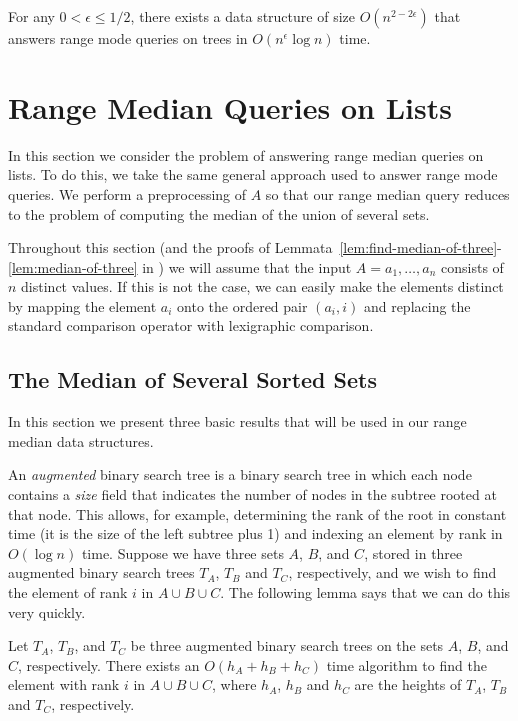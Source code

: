 \documentclass{njcarticle}
\begin{document}
\begin{theorem}
For any $0<\epsilon\le 1/2$, there exists a data structure of size
$O(n^{2-2\epsilon})$ that answers range mode queries on trees in
$O(n^\epsilon\log n)$ time.
\end{theorem}

\section{Range Median Queries on Lists}

In this section we consider the problem of answering range median
queries on lists.  To do this, we take the same general approach used
to answer range mode queries.  We perform a preprocessing of $A$ so
that our range median query reduces to the problem of computing the
median of the union of several sets.

Throughout this section (and the proofs of
Lemmata~\ref{lem:find-median-of-three}-\ref{lem:median-of-three} in
) we will assume that the input $A=a_1,\ldots,a_n$
consists of $n$ distinct values.  If this is not the case, we can
easily make the elements distinct by mapping the element $a_i$ onto
the ordered pair $(a_i,i)$ and replacing the standard comparison
operator with lexigraphic comparison.

\subsection{The Median of Several Sorted Sets}

In this section we present three basic results that will be used in
our range median data structures.  

An \emph{augmented} binary search tree is a binary search tree in
which each node contains a \emph{size} field that indicates the number
of nodes in the subtree rooted at that node. This allows, for example,
determining the rank of the root in constant time (it is the size of
the left subtree plus 1) and indexing an element by rank in $O(\log
n)$ time.  Suppose we have three sets $A$, $B$, and $C$, stored in
three augmented binary search trees $T_A$, $T_B$ and $T_C$,
respectively, and we wish to find the element of rank $i$ in $A\cup B\cup
C$.  The following lemma says that we can do this very quickly.

\begin{lemma}
Let $T_A$, $T_B$, and $T_C$ be three augmented binary search trees on the sets
$A$, $B$, and $C$, respectively.  There exists an $O(h_A+h_B+h_C)$ time
algorithm to find the element with rank $i$ in $A\cup B\cup C$, where $h_A$,
$h_B$ and $h_C$ are the heights of $T_A$, $T_B$ and $T_C$, respectively.
\end{lemma}
\end{document}
